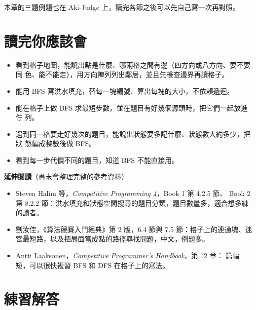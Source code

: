 本章的三題例題也在 Aki-Judge 上，讀完各節之後可以先自己寫一次再對照。

\section{讀完你應該會}
\label{sec:ch12-checklist}

\begin{itemize}
\item 看到格子地圖，能說出點是什麼、哪兩格之間有邊（四方向或八方向、要不要同
色、能不能走），用方向陣列列出鄰居，並且先檢查邊界再讀格子。
\item 能用 BFS 寫洪水填充，替每一塊編號、算出每塊的大小，不依賴遞迴。
\item 能在格子上做 BFS 求最短步數，並在題目有好幾個源頭時，把它們一起放進佇
列。
\item 遇到同一格要走好幾次的題目，能說出狀態要多記什麼、狀態數大約多少，把狀
態編成整數後做 BFS。
\item 看到每一步代價不同的題目，知道 BFS 不能直接用。
\end{itemize}

\textbf{延伸閱讀}（書末會整理完整的參考資料）

\begin{itemize}
\item Steven Halim 等，\textit{Competitive Programming 4}，Book 1 第 4.2.5 節、
Book 2 第 8.2.2 節：洪水填充和狀態空間搜尋的題目分類，題目數量多，適合想多練
的讀者。
\item 劉汝佳，《算法競賽入門經典》第 2 版，6.4 節與 7.5 節：格子上的連通塊、迷
宮最短路，以及把局面當成點的路徑尋找問題，中文，例題多。
\item Antti Laaksonen，\textit{Competitive Programmer's Handbook}，第 12 章：
篇幅短，可以很快複習 BFS 和 DFS 在格子上的寫法。
\end{itemize}

\section*{練習解答}

